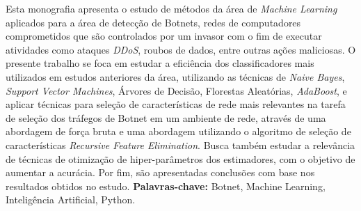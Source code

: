 \begin{resumo}
Esta monografia apresenta o estudo de métodos da área de \textit{Machine Learning} aplicados para a área de detecção de Botnets, redes de computadores comprometidos que são controlados por um invasor com o fim de executar atividades como ataques \textit{DDoS}, roubos de dados, entre outras ações maliciosas. O presente trabalho se foca em estudar a eficiência dos classificadores mais utilizados em estudos anteriores da área, utilizando as técnicas de \textit{Naive Bayes}, \textit{Support Vector Machines}, Árvores de Decisão, Florestas Aleatórias, \textit{AdaBoost}, e aplicar técnicas para seleção de características de rede mais relevantes na tarefa de seleção dos tráfegos de Botnet em um ambiente de rede, através de uma abordagem de força bruta e uma abordagem utilizando o algoritmo de seleção de características \textit{Recursive Feature Elimination}. Busca também estudar a relevância de técnicas de otimização de hiper-parâmetros dos estimadores, com o objetivo de aumentar a acurácia. Por fim, são apresentadas conclusões com base nos resultados obtidos no estudo. \linebreak
\textbf{Palavras-chave:} Botnet, Machine Learning, Inteligência Artificial, Python.
\end{resumo}